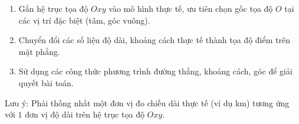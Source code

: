\begin{enumerate}
\item Gắn hệ trục tọa độ $Oxy$ vào mô hình thực tế, ưu tiên chọn gốc tọa độ $O$ tại các vị trí đặc biệt (tâm, góc vuông).
\item Chuyển đổi các số liệu độ dài, khoảng cách thực tế thành tọa độ điểm trên mặt phẳng.
\item Sử dụng các công thức phương trình đường thẳng, khoảng cách, góc để giải quyết bài toán.
\end{enumerate}
Lưu ý: Phải thống nhất một đơn vị đo chiều dài thực tế (ví dụ km) tương ứng với $1$ đơn vị độ dài trên hệ trục tọa độ $Oxy$.
